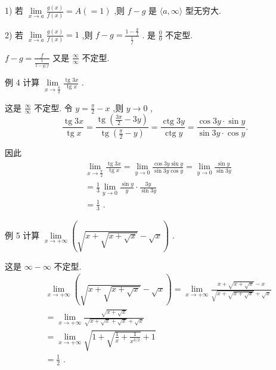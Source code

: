 1) 若 $\mathop{\lim }\limits_{{x \rightarrow  a}}\frac{g\left( x\right) }{f\left( x\right) } = A\left( { = 1}\right)$ ,则 $f - g$ 是 $\langle a,\infty \rangle$ 型无穷大.

2) 若 $\mathop{\lim }\limits_{{x \rightarrow  a}}\frac{g\left( x\right) }{f\left( x\right) } = 1$ ,则 $f - g = \frac{1 - \frac{g}{f}}{\frac{1}{f}}$ . 是 $\frac{0}{0}$ 不定型.

$f - g = \frac{f}{\frac{1}{1 - g/f}}$ 又是 $\frac{\infty }{\infty }$ 不定型.

例 4 计算 $\mathop{\lim }\limits_{{x \rightarrow  \frac{\pi }{2}}}\frac{\operatorname{tg}{3x}}{\operatorname{tg}x}$ .

这是 $\frac{\infty }{\infty }$ 不定型. 令 $y = \frac{\pi }{2} - x$ ,则 $y \rightarrow  0$ ,
$$\frac{\operatorname{tg}{3x}}{\operatorname{tg}x} = \frac{\operatorname{tg}\left( {\frac{3\pi }{2} - {3y}}\right) }{\operatorname{tg}\left( {\frac{\pi }{2} - y}\right) } = \frac{\operatorname{ctg}{3y}}{\operatorname{ctg}y} = \frac{\cos {3y} \cdot  \sin y}{\sin {3y} \cdot  \cos y}.$$

因此
\begin{align*}
	&\mathop{\lim }\limits_{{x \rightarrow  \frac{\pi }{2}}}\frac{\operatorname{tg}{3x}}{\operatorname{tg}x} = \mathop{\lim }\limits_{{y \rightarrow  0}}\frac{\cos {3y}\sin y}{\sin {3y}\cos y} = \mathop{\lim }\limits_{{y \rightarrow  0}}\frac{\sin y}{\sin {3y}}\\
	&= \frac{1}{3}\mathop{\lim }\limits_{{y \rightarrow  0}}\frac{\sin y}{y} \cdot  \frac{3y}{\sin {3y}}\\
	&= \frac{1}{3}\text{ . }
\end{align*}

例 5 计算 $\mathop{\lim }\limits_{{x \rightarrow   + \infty }}\left( {\sqrt{x + \sqrt{x + \sqrt{x}}} - \sqrt{x}}\right)$ .

这是 $\infty  - \infty$ 不定型.
\begin{align*}
	&\mathop{\lim }\limits_{{x \rightarrow   + \infty }}\left( {\sqrt{x + \sqrt{x + \sqrt{x}}} - \sqrt{x}}\right)  = \mathop{\lim }\limits_{{x \rightarrow   + \infty }}\frac{x + \sqrt{x + \sqrt{x}} - x}{\sqrt{x + \sqrt{x + \sqrt{x}}} + \sqrt{x}}\\
	&= \mathop{\lim }\limits_{{x \rightarrow   + \infty }}\frac{\sqrt{x + \sqrt{x}}}{\sqrt{x + \sqrt{x} + \sqrt{x}} + \sqrt{x}}\\
	&= \mathop{\lim }\limits_{{x \rightarrow   + \infty }}\sqrt{1 + \sqrt{\frac{1}{x} + \frac{1}{{x}^{3/2}}} + 1}\\
	&= \frac{1}{2}\text{ . }
\end{align*}

